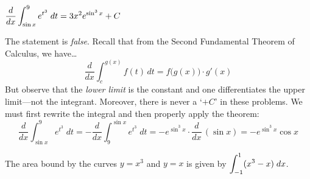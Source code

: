 \documentclass[11pt,letterpaper]{article}
\begin{document}
 $\displaystyle \dfrac{d}{dx} \int_{\sin x}^9 e^{t^3} \;dt= 3x^2 e^{\sin^3 x} + C$ \pspace

\sol The statement is \textit{false}. Recall that from the Second Fundamental Theorem of Calculus, we have\dots
	\[
	\dfrac{d}{dx} \int_c^{g(x)} f(t) \,dt= f \big(g(x) \big) \cdot g'(x)
	\]
But observe that the \textit{lower limit} is the constant and one differentiates the upper limit---not the integrant. Moreover, there is never a `$+ C$' in these problems. We must first rewrite the integral and then properly apply the theorem:
	\[
	 \dfrac{d}{dx} \int_{\sin x}^9 e^{t^3} \;dt= - \dfrac{d}{dx} \int_9^{\sin x} e^{t^3} \;dt= -e^{\sin^3 x} \cdot \dfrac{d}{dx} \, (\sin x)= -e^{\sin^3 x} \cos x 
	\]



\newpage



 The area bound by the curves $y= x^3$ and $y= x$ is given by $\displaystyle\int_{-1}^1 (x^3 - x) \; dx$. \pspace
\end{document}
